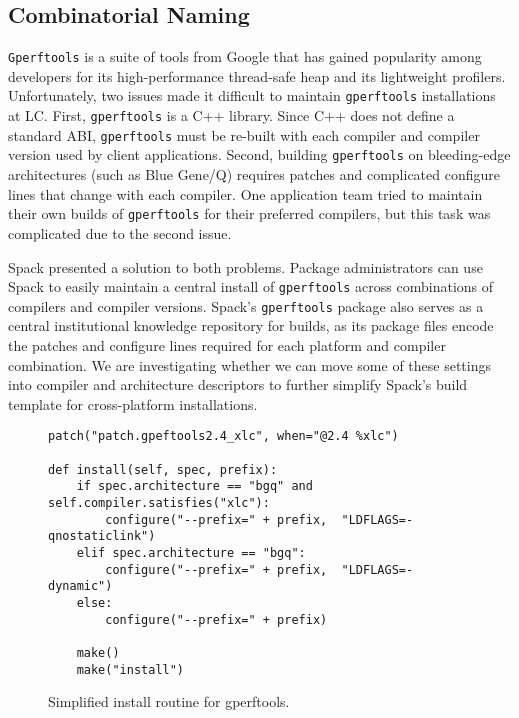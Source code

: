 
\subsection{Combinatorial Naming}
\label{sec:usecase-combinatorial}

{\tt Gperftools} is a suite of tools from Google that has gained popularity among
developers for its high-performance thread-safe heap and its lightweight profilers.
Unfortunately, two issues made it difficult to maintain {\tt gperftools} installations
at LC.  First, {\tt gperftools} is a C++ library.  Since C++ does not define a standard
ABI, {\tt gperftools} must be re-built with each compiler and compiler version used by client
applications.  Second, building {\tt gperftools} on bleeding-edge architectures
(such as Blue Gene/Q) requires patches and complicated configure lines that
change with each compiler.  One application team tried to maintain their own
builds of {\tt gperftools} for their preferred compilers, but this
task was complicated due to the second issue.

Spack presented a solution to both problems.  Package administrators can use Spack to
easily maintain a central install of {\tt gperftools} across combinations of
compilers and compiler versions.  Spack's {\tt gperftools} package also serves as a central
institutional knowledge repository for builds, as its package files encode
the patches and configure lines required for each platform and compiler combination.
We are investigating whether we can move some of these settings into compiler and
architecture descriptors to further simplify Spack's build template for cross-platform
installations.
\begin{figure}
\begin{verbatim}
patch("patch.gpeftools2.4_xlc", when="@2.4 %xlc")

def install(self, spec, prefix):
    if spec.architecture == "bgq" and self.compiler.satisfies("xlc"):
        configure("--prefix=" + prefix,  "LDFLAGS=-qnostaticlink")
    elif spec.architecture == "bgq":
        configure("--prefix=" + prefix,  "LDFLAGS=-dynamic")
    else:
        configure("--prefix=" + prefix)

    make()
    make("install")
\end{verbatim}
  \caption{
    Simplified install routine for gperftools.
    \label{fig:gperftools}
  }
\end{figure}


